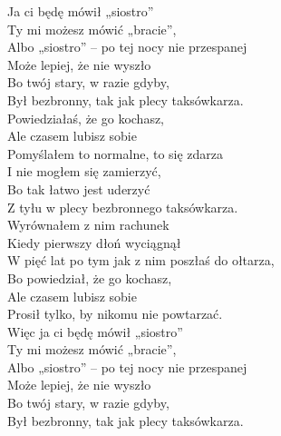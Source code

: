 
Ja ci będę mówił „siostro” \tab{}\\
Ty mi możesz mówić „bracie”,\tab{} \\
Albo „siostro” – po tej nocy nie przespanej  \\
Może lepiej, że nie wyszło \tab{} \\
Bo twój stary, w razie gdyby,\tab{} \\
Był bezbronny, tak jak plecy taksówkarza. \\
\hops
Powiedziałaś, że go kochasz, \\
Ale czasem lubisz sobie \tab{}\\
Pomyślałem to normalne, to się zdarza  \\
I nie mogłem się zamierzyć,\tab{} \\
Bo tak łatwo jest uderzyć \tab{}\\
Z tyłu w plecy bezbronnego taksówkarza.  \\
\hops
{} Wyrównałem z nim rachunek\tab{} \\
 Kiedy pierwszy dłoń wyciągnął \tab{}\\
 W pięć lat po tym jak z nim poszłaś do ołtarza, \\
 Bo powiedział, że go kochasz,\tab{}  \\
 Ale czasem lubisz sobie\tab{}\tab{}  \\
 Prosił tylko, by nikomu nie powtarzać.\tab{}  \\
\hops
Więc ja ci będę mówił „siostro” \\
Ty mi możesz mówić „bracie”, \\
Albo „siostro” – po tej nocy nie przespanej \\
Może lepiej, że nie wyszło \\
Bo twój stary, w razie gdyby, \\
Był bezbronny, tak jak plecy taksówkarza.